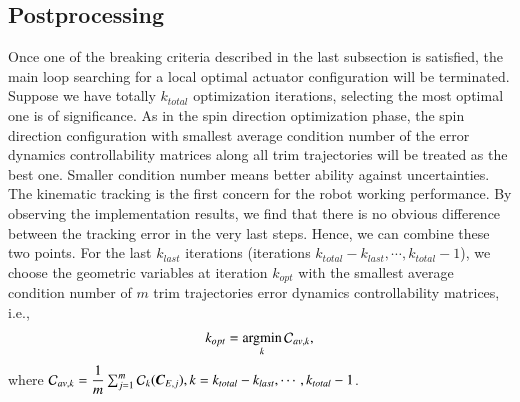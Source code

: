 \subsection{Postprocessing}
Once one of the breaking criteria described in the last subsection is satisfied, the main loop searching for a local optimal actuator configuration will be terminated. Suppose we have totally $k_{total}$ optimization iterations, selecting the most optimal one is of significance. As in the spin direction optimization phase, the spin direction configuration with smallest average condition number of the error dynamics controllability matrices along all trim trajectories will be treated as the best one. Smaller condition number means better ability against uncertainties. The kinematic tracking is the first concern for the robot working performance. By observing the implementation results, we find that there is no obvious difference between the tracking error in the very last steps. Hence, we can combine these two points. For the last $k_{last}$ iterations (iterations $k_{total}-k_{last}, \cdots, k_{total}-1$), we choose the geometric variables at iteration $k_{opt}$ with the smallest average condition number of $m$ trim trajectories error dynamics controllability matrices, i.e., 
\begin{align}
k_{opt}=\displaystyle \operatorname*{\arg\!\min}_{k}\mathcal{C}_{av,k}, 
\end{align} 
where
$\mathcal{C}_{av,k}=\dfrac{1}{m}\sum_{j=1}^{m}\mathcal{C}_{k}(\emph{\textbf{C}}_{E,j}), k=k_{total}-k_{last}, \cdots, k_{total}-1$. 
  
